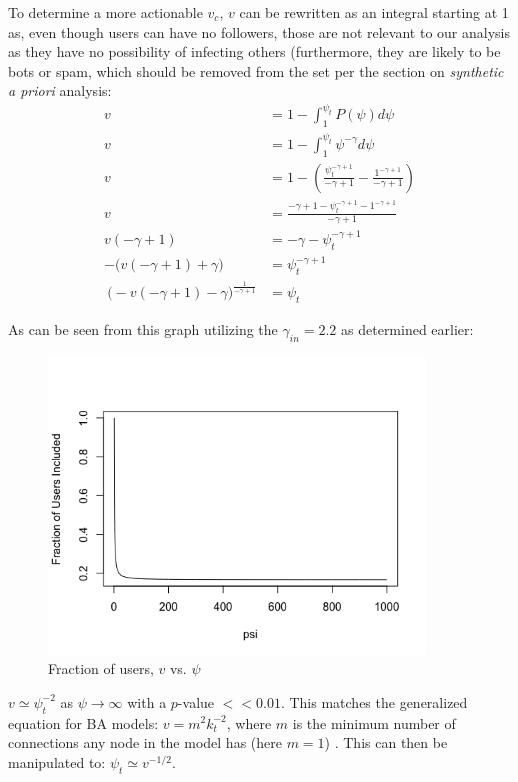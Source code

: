 \documentclass[NETN,manuscript]{stjour-new}
\begin{document}
To determine a more actionable $v_c$, $v$ can be rewritten as an integral starting at 1 as, even though users can have no followers, those are not relevant to our analysis as they have no possibility of infecting others (furthermore, they are likely to be bots or spam, which should be removed from the set per the section on \textit{synthetic a priori} analysis:
\begin{equation}
\begin{split}
    v & = 1 - \int_1^{\psi_{t}} P(\psi)d\psi \\
   v & = 1 - \int_1^{\psi_{t}} \psi^{-\gamma}d\psi \\
   v & = 1 - \left(\frac{\psi_{t}^{-\gamma +1}}{-\gamma+1}-\frac{1^{-\gamma +1}}{-\gamma+1}\right) \\
   v & = \frac{-\gamma+1 - \psi_{t}^{-\gamma +1} -  1^{-\gamma +1}}{-\gamma+1} \\
   v(-\gamma + 1) & = -\gamma - \psi_{t}^{-\gamma +1}\\
   -\big(v(-\gamma + 1) + \gamma\big) & = \psi_{t}^{-\gamma+1}\\\
   \big(-v(-\gamma + 1) - \gamma\big)^{\frac{1}{-\gamma + 1}} & = \psi_t
\end{split}
\end{equation}

As can be seen from this graph utilizing the $\gamma_{in} = 2.2$ as determined earlier:
\begin{figure}[h]
 \centering
  \includegraphics[width=10cm]{Fraction of users included.png}
  \caption{Fraction of users, $v$ vs. $\psi$}\label{fig:Fraction of users,v, vs. $\psi$}
 \end{figure}

$v \simeq \psi_t^{-2}$ as $\psi \rightarrow \infty$ with a $p$-value $<< 0.01$. This matches the generalized equation for BA models: $v = m^2k_t^{-2}$, where $m$ is the minimum number of connections any node in the model has (here $m = 1$) \citep{pastor2001epidemic}. This can then be manipulated to: $\psi_t \simeq v^{-1/2}$. 
\end{document}
